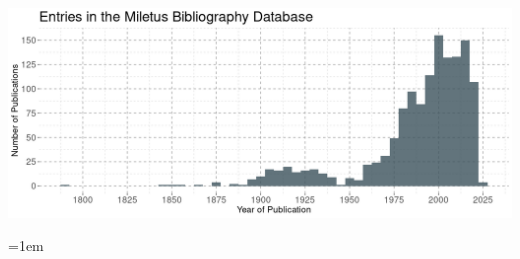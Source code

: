 \documentclass[a4paper,openany]{scrbook}
\begin{document}


\newpage

\begin{multicols}{2}
    \tableofcontents
\end{multicols}

\newpage


\vfill
\includegraphics[width=\textwidth]{../out/figures/mil-pubs-by-year.png}


\begin{flushleft}%
\newpage 

\setlength{\parskip}{6pt}
\hangindent=1em



\end{flushleft}
\end{document}
